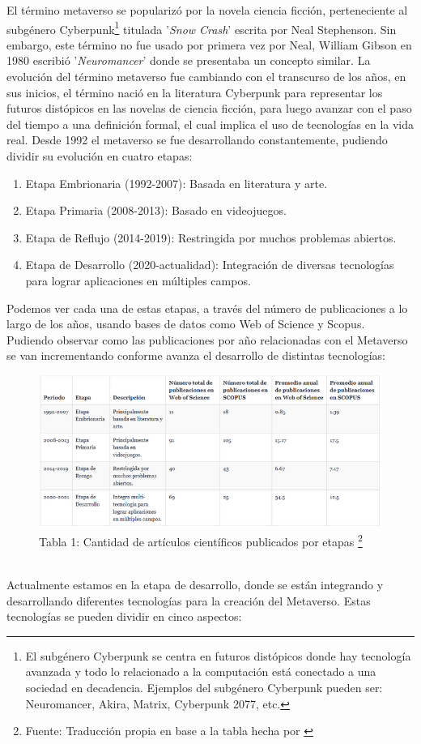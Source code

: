 \documentclass[a4paper,10pt]{article}
\begin{document}
	El término metaverso se popularizó por la novela ciencia ficción, perteneciente al subgénero Cyberpunk\footnote{El subgénero Cyberpunk se centra en futuros distópicos donde hay tecnología avanzada y todo lo relacionado a la computación está conectado a una sociedad en decadencia. Ejemplos del subgénero Cyberpunk pueden ser: Neuromancer, Akira, Matrix, Cyberpunk 2077, etc.} titulada '\textit{Snow Crash}' escrita por Neal Stephenson. Sin embargo, este término no fue usado por primera vez por Neal, William Gibson en 1980 escribió '\textit{Neuromancer}' donde se presentaba un concepto similar.
	La evolución del término metaverso fue cambiando con el transcurso de los años, en sus inicios, el término nació en la literatura Cyberpunk para representar los futuros distópicos en las novelas de ciencia ficción, para luego avanzar con el paso del tiempo a una definición formal, el cual implica el uso de tecnologías en la vida real. Desde 1992 el metaverso se fue desarrollando constantemente, pudiendo dividir su evolución en cuatro etapas:
	\begin{enumerate}
		\item Etapa Embrionaria (1992-2007): Basada en literatura y arte.
		\item Etapa Primaria (2008-2013): Basado en videojuegos.
		\item Etapa de Reflujo (2014-2019): Restringida por muchos problemas abiertos.
		\item Etapa de Desarrollo (2020-actualidad): Integración de diversas tecnologías para lograr aplicaciones en múltiples campos.
	\end{enumerate}
	Podemos ver cada una de estas etapas, a través del número de publicaciones a lo largo de los años, usando bases de datos como Web of Science y Scopus. Pudiendo observar como las publicaciones por año relacionadas con el Metaverso se van incrementando conforme avanza el desarrollo de distintas tecnologías:
	\begin{figure}[h]
		\centering
		\includegraphics[width=1.0\textwidth]{tablaPublicaciones.PNG}
		\caption[Tabla 1:]{Tabla 1: Cantidad de artículos científicos publicados por etapas \footnote{Fuente: Traducción propia en base a la tabla hecha por \textcite{ning2023survey}}}
		\label{fig:tabla_publicaciones}
	\end{figure} \\
	Actualmente estamos en la etapa de desarrollo, donde se están integrando y desarrollando diferentes tecnologías para la creación del Metaverso. Estas tecnologías se pueden dividir en cinco aspectos:
\end{document}
